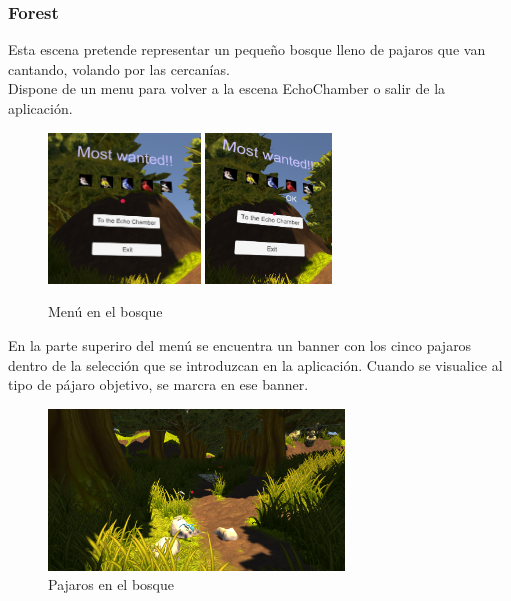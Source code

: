 	\subsubsection{Forest}

\quad Esta escena pretende representar un pequeño bosque lleno de pajaros que van cantando, volando por las cercanías.\\

\quad Dispone de un menu para volver a la escena EchoChamber o salir de la aplicación.\\

\begin{figure}[htb]
	\centering
	\includegraphics[width=0.36\textwidth]{./imagenes/forestMenu}
	\includegraphics[width=0.30\textwidth]{./imagenes/forestMenuActive}
	\caption{Menú en el bosque}
\end{figure}

\quad En la parte superiro del menú se encuentra un banner con los cinco pajaros dentro de la selección que se introduzcan en la aplicación. Cuando se visualice al tipo de pájaro objetivo, se marcra en ese banner.\\

\begin{figure}[htb]
	\centering
	\includegraphics[width=0.7\textwidth]{./imagenes/forestBirds}
	\caption{Pajaros en el bosque}
\end{figure}

